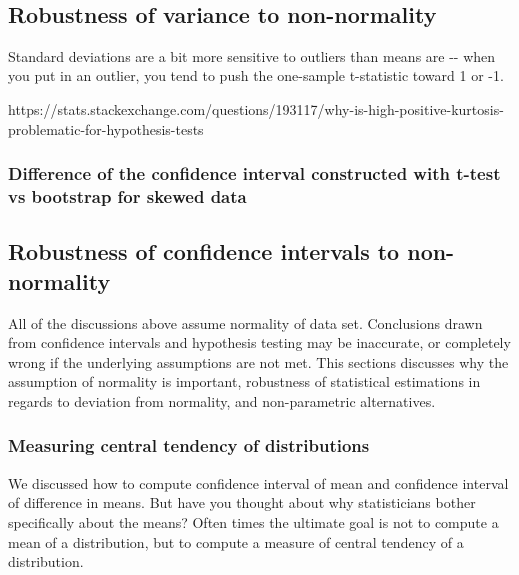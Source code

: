 \documentclass[11pt]{article}
\begin{document}
    \begin{center}
    \end{center}
    { \hspace*{\fill} \\}
    
    \subsection{Robustness of variance to
non-normality}\label{robustness-of-variance-to-non-normality}

Standard deviations are a bit more sensitive to outliers than means are
-\/- when you put in an outlier, you tend to push the one-sample
t-statistic toward 1 or -1.

https://stats.stackexchange.com/questions/193117/why-is-high-positive-kurtosis-problematic-for-hypothesis-tests

\subsubsection{Difference of the confidence interval constructed with
t-test vs bootstrap for skewed
data}\label{difference-of-the-confidence-interval-constructed-with-t-test-vs-bootstrap-for-skewed-data}

    \subsection{Robustness of confidence intervals to
non-normality}\label{robustness-of-confidence-intervals-to-non-normality}

All of the discussions above assume normality of data set. Conclusions
drawn from confidence intervals and hypothesis testing may be
inaccurate, or completely wrong if the underlying assumptions are not
met. This sections discusses why the assumption of normality is
important, robustness of statistical estimations in regards to deviation
from normality, and non-parametric alternatives.

    \hypertarget{central_tendency}{}

\subsubsection{Measuring central tendency of
distributions}\label{measuring-central-tendency-of-distributions}

We discussed how to compute confidence interval of mean and confidence
interval of difference in means. But have you thought about why
statisticians bother specifically about the means? Often times the
ultimate goal is not to compute a mean of a distribution, but to compute
a measure of central tendency of a distribution.
\end{document}
